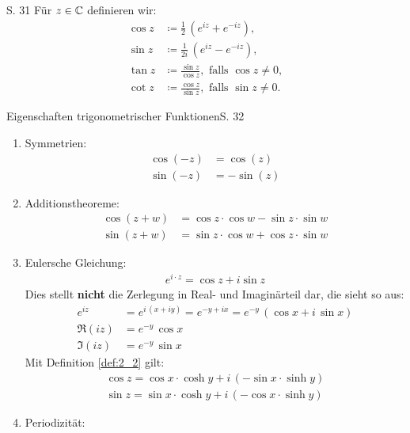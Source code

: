 \begin{definition}{S. 31}
  \label{def:2_2}
  Für $z \in \mathbb{C}$ definieren wir:
  \begin{align}
    \cos z &\coloneqq \frac{1}{2}  \, \left( e^{iz} + e^{-iz} \right),\\
    \sin z &\coloneqq \frac{1}{2i} \, \left( e^{iz} - e^{-iz} \right),\\
    \tan z &\coloneqq \frac{\sin z}{\cos z}, \text{ falls } \cos z \neq 0,\\
    \cot z &\coloneqq \frac{\cos z}{\sin z}, \text{ falls } \sin z \neq 0.
  \end{align}
\end{definition}

\begin{bemerkung}{Eigenschaften trigonometrischer Funktionen}{S. 32}
  \begin{enumerate}
    \item Symmetrien:
      \begin{align}
        \cos(-z) &= \cos(z)\\
        \sin(-z) &= - \sin(z)
      \end{align}
    \item Additionstheoreme:
      \begin{align}
        \cos(z+w) &= \cos z \cdot \cos w - \sin z \cdot \sin w\\
        \sin(z+w) &= \sin z \cdot \cos w + \cos z \cdot \sin w
      \end{align}
    \item Eulersche Gleichung:
      \begin{align}
        e ^{i \cdot z} = \cos z + i \sin z
      \end{align}
      Dies stellt \textbf{nicht} die Zerlegung in Real- und Imaginärteil dar, die sieht so aus:
      \begin{align}
        e^{iz} &= e^{i \, (x+iy)} = e^{-y + ix} = e^{-y} \, \left( \cos x + i \, \sin x \right)\\
        \Re(iz) &= e^{-y} \, \cos x\\
        \Im(iz) &= e^{-y} \, \sin x
      \end{align}
      Mit Definition \ref{def:2_2} gilt:
      \begin{align}
        \cos z = \cos x \cdot \cosh y + i \, (- \sin x \cdot \sinh y)\\
        \sin z = \sin x \cdot \cosh y + i \, (- \cos x \cdot \sinh y)
      \end{align}
    \item Periodizität:\\

\end{enumerate}
\end{bemerkung}
